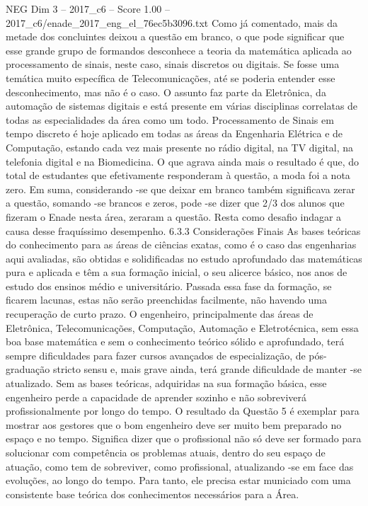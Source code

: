 \begin{textsample}{NEG Dim 3 – 2017\_c6 – Score 1.00 – 2017\_c6/enade\_2017\_eng\_el\_76ec5b3096.txt}
Como já comentado, mais da metade dos concluintes deixou a questão em branco, o que pode significar que esse grande grupo de formandos desconhece a teoria da matemática aplicada ao processamento de sinais, neste caso, sinais discretos ou digitais.
Se fosse uma temática muito específica de Telecomunicações, até se poderia entender esse desconhecimento, mas não é o caso.
O assunto faz parte da Eletrônica, da automação de sistemas digitais e está presente em várias disciplinas correlatas de todas as especialidades da área como um todo.
Processamento de Sinais em tempo discreto é hoje aplicado em todas as áreas da Engenharia Elétrica e de Computação, estando cada vez mais presente no rádio digital, na TV digital, na telefonia digital e na Biomedicina.
O que agrava ainda mais o resultado é que, do total de estudantes que efetivamente responderam à questão, a moda foi a nota zero.
Em suma, considerando -se que deixar em branco também significava zerar a questão, somando -se brancos e zeros, pode -se dizer que 2/3 dos alunos que fizeram o Enade nesta área, zeraram a questão.
Resta como desafio indagar a causa desse fraquíssimo desempenho. 6.3.3 Considerações Finais As bases teóricas do conhecimento para as áreas de ciências exatas, como é o caso das engenharias aqui avaliadas, são obtidas e solidificadas no estudo aprofundado das matemáticas pura e aplicada e têm a sua formação inicial, o seu alicerce básico, nos anos de estudo dos ensinos médio e universitário.
Passada essa fase da formação, se ficarem lacunas, estas não serão preenchidas facilmente, não havendo uma recuperação de curto prazo.
O engenheiro, principalmente das áreas de Eletrônica, Telecomunicações, Computação, Automação e Eletrotécnica, sem essa boa base matemática e sem o conhecimento teórico sólido e aprofundado, terá sempre dificuldades para fazer cursos avançados de especialização, de pós-graduação stricto sensu e, mais grave ainda, terá grande dificuldade de manter -se atualizado.
Sem as bases teóricas, adquiridas na sua formação básica, esse engenheiro perde a capacidade de aprender sozinho e não sobreviverá profissionalmente por longo do tempo.
O resultado da Questão 5 é exemplar para mostrar aos gestores que o bom engenheiro deve ser muito bem preparado no espaço e no tempo.
Significa dizer que o profissional não só deve ser formado para solucionar com competência os problemas atuais, dentro do seu espaço de atuação, como tem de sobreviver, como profissional, atualizando -se em face das evoluções, ao longo do tempo.
Para tanto, ele precisa estar municiado com uma consistente base teórica dos conhecimentos necessários para a Área.

\end{textsample}

